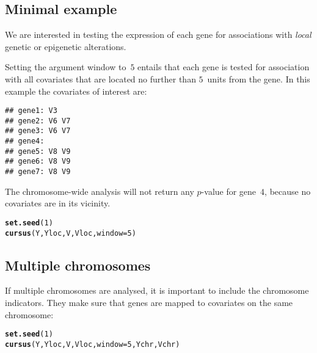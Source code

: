 \documentclass{article}\usepackage[]{graphicx}\usepackage[]{color}
\makeatletter
\newcommand{\hlnum}[1]{\textcolor[rgb]{0.686,0.059,0.569}{#1}}%
\newcommand{\hlstd}[1]{\textcolor[rgb]{0.345,0.345,0.345}{#1}}%
\newcommand{\hlkwc}[1]{\textcolor[rgb]{0.333,0.667,0.333}{#1}}%
\newcommand{\hlkwd}[1]{\textcolor[rgb]{0.737,0.353,0.396}{\textbf{#1}}}%
\newenvironment{kframe}{%
 \def\at@end@of@kframe{}%
 \ifinner\ifhmode%
  \def\at@end@of@kframe{\end{minipage}}%
  \begin{minipage}{\columnwidth}%
 \fi\fi%
 \def\FrameCommand##1{\hskip\@totalleftmargin \hskip-\fboxsep
 \colorbox{shadecolor}{##1}\hskip-\fboxsep
     \hskip-\linewidth \hskip-\@totalleftmargin \hskip\columnwidth}%
 \MakeFramed {\advance\hsize-\width
   \@totalleftmargin\z@ \linewidth\hsize
   \@setminipage}}%
 {\par\unskip\endMakeFramed%
 \at@end@of@kframe}
\newenvironment{knitrout}{}{} %
\makeatother
\begin{document}
\subsection{Minimal example}
\label{GWA Minimal example}

We are interested in testing the expression of each gene for associations with \textit{local} genetic or epigenetic alterations.

Setting the argument window to~$5$ entails that each gene is tested for association with all covariates that are located no further than $5$~units from the gene. In this example the covariates of interest are:

\begin{knitrout}
\color{fgcolor}\begin{kframe}
\begin{verbatim}
## gene1: V3 
## gene2: V6 V7 
## gene3: V6 V7 
## gene4:  
## gene5: V8 V9 
## gene6: V8 V9 
## gene7: V8 V9
\end{verbatim}
\end{kframe}
\end{knitrout}

The chromosome-wide analysis will not return any \mbox{$p$-value} for gene~$4$, because no covariates are in its vicinity.
\begin{knitrout}
\color{fgcolor}\begin{kframe}
\begin{alltt}
\hlkwd{set.seed}\hlstd{(}\hlnum{1}\hlstd{)}
\hlkwd{cursus}\hlstd{(Y,Yloc,V,Vloc,}\hlkwc{window}\hlstd{=}\hlnum{5}\hlstd{)}
\end{alltt}
\end{kframe}
\end{knitrout}

\subsection{Multiple chromosomes}
\label{GWA Mutiple chromosomes}

If multiple chromosomes are analysed, it is important to include the chromosome indicators. They make sure that genes are mapped to covariates on the same chromosome:
\begin{knitrout}
\color{fgcolor}\begin{kframe}
\begin{alltt}
\hlkwd{set.seed}\hlstd{(}\hlnum{1}\hlstd{)}
\hlkwd{cursus}\hlstd{(Y,Yloc,V,Vloc,}\hlkwc{window}\hlstd{=}\hlnum{5}\hlstd{,Ychr,Vchr)}
\end{alltt}
\end{kframe}
\end{knitrout}
\end{document}
